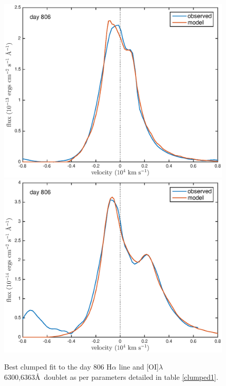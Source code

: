 \documentclass[useAMS,usenatbib,usegraphicx]{mnras}
\begin{document}
\begin{figure}
\begin{center}
\includegraphics[trim =37 10 45 15,clip=true,scale=0.51]{clump_1/best_fit/d806Ha}
\includegraphics[trim =35 10 45 15,clip=true,scale=0.51]{clump_1/best_fit/d806OI}
\caption{Best clumped fit to the day 806 H$\alpha$ line and [OI]$\lambda$6300,6363\AA\ doublet as per parameters detailed in table \ref{clumped1}.}
\label{d806_c}
\end{center}
\end{figure}
\end{document}
